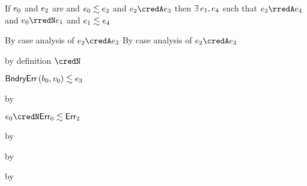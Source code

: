 \begin{lemma}\label{HA-simulation-A}\leavevmode
  If\/ $e_0$ and $e_2$ are \reducedsurfaceexpressions{}
  and\/ $e_0 \lesssim e_2$
  and\/ $\sexpr_2 \credA \sexpr_3$
  then\/ $\exists\,e_1,e_4$
  such that\/ $\sexpr_3 \rredA \sexpr_4$
  and\/ $\sexpr_0 \rredN \sexpr_1$
  and\/ $e_1 \lesssim e_4$
\end{lemma}{
  \newcommand{\shortproof}{By case analysis of $\sexpr_2 \credA \sexpr_3$}
\begin{lamportproof*}
  \shortproof
\mainproof
  \shortproof

    \begin{pfproof}
        \begin{pfproof}
          by definition $\credN$
        \end{pfproof}
      \qedstep
        \begin{pfproof}
          $\mathsf{BndryErr}\,(b_0, v_0) \lesssim e_3$
        \end{pfproof}
    \end{pfproof}

    \begin{pfproof}
        \begin{pfproof}
          by 
        \end{pfproof}
      \qedstep
        \begin{pfproof}
          $\sexpr_0 \credN \rexpr{\eerr_0}{\eerr_2}$
        \end{pfproof}
    \end{pfproof}

    \begin{pfproof}
        \begin{pfproof}
          by 
        \end{pfproof}
        \begin{pfproof}
          by 
        \end{pfproof}
      \qedstep
        \begin{pfproof}
          by 
        \end{pfproof}
    \end{pfproof}


\end{lamportproof*}}
